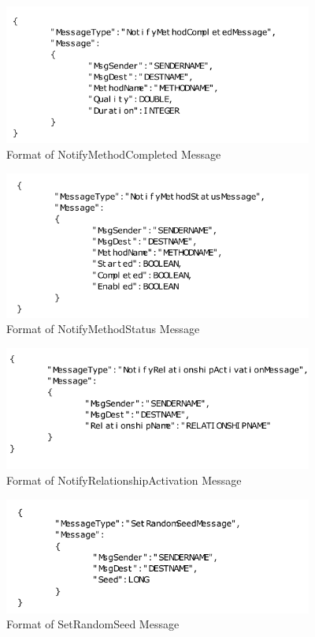 \begin{enumerate}
\begin{figure}[H]
\centering
\includegraphics[width=4in]{figs/NotifyMethodCompleted.pdf}
\caption{Format of NotifyMethodCompleted Message}
\label{fig:NotifyMethodCompleted}
\end{figure}

\begin{figure}[H]
\centering
\includegraphics[width=4in]{figs/NotifyMethodStatus.pdf}
\caption{Format of NotifyMethodStatus Message}
\label{fig:NotifyMethodStatus}
\end{figure}

\begin{figure}[H]
\centering
\includegraphics[width=4in]{figs/NotifyRelationshipActivation.pdf}
\caption{Format of NotifyRelationshipActivation Message}
\label{fig:NotifyRelationshipActivation}
\end{figure}

\begin{figure}[H]
\centering
\includegraphics[width=4in]{figs/SetRandomSeed.pdf}
\caption{Format of SetRandomSeed Message}
\label{fig:SetRandomSeed}
\end{figure}


\end{enumerate}
